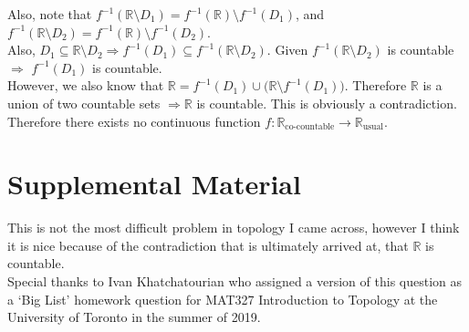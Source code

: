 \documentclass{article}
\begin{document}
Also, note that $f^{-1}(\mathbb{R} \setminus D_1) = f^{-1}(\mathbb{R}) \setminus f^{-1}(D_1)$, and $f^{-1}(\mathbb{R} \setminus D_2) = f^{-1}(\mathbb{R}) \setminus f^{-1}(D_2)$.\\

Also, $D_1 \subseteq \mathbb{R} \setminus D_2 \Rightarrow f^{-1}(D_1) \subseteq f^{-1}(\mathbb{R} \setminus D_2)$. Given  $f^{-1}(\mathbb{R} \setminus D_2)$ is countable $\Rightarrow$ $f^{-1}(D_1)$ is countable.\\

However, we also know that $\mathbb{R}=f^{-1}(D_1) \cup \big( \mathbb{R}\setminus f^{-1}(D_1) \big)$. Therefore $\mathbb{R}$ is a union of two countable sets $\Rightarrow \mathbb{R}$ is countable. This is obviously a contradiction. Therefore there exists no continuous function $f:\mathbb{R}_\text{co-countable} \longrightarrow \mathbb{R}_\text{usual}$.


\section{Supplemental Material}

This is not the most difficult problem in topology I came across, however I think it is nice because of the contradiction that is ultimately arrived at, that $\mathbb{R}$ is countable.\\

Special thanks to Ivan Khatchatourian who assigned a version of this question as a `Big List' homework question for MAT327 Introduction to Topology at the University of Toronto in the summer of 2019.
\end{document}
